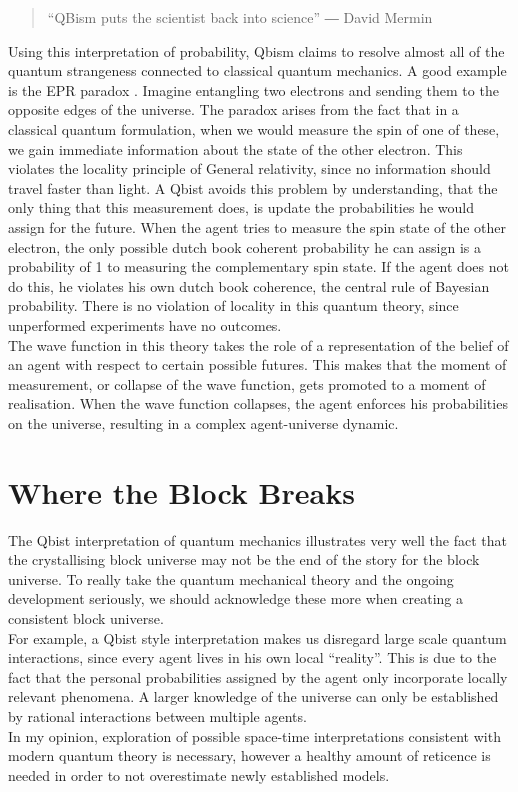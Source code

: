 \documentclass[11pt, a4 paper]{article}
\begin{document}
\begin{multicols}{2}
\begin{quote}
    ``QBism puts the scientist back into science'' \newline― David Mermin \cite{mermin}
\end{quote}
Using this interpretation of probability, Qbism claims to resolve almost all of the quantum strangeness connected to classical quantum mechanics. A good example is the EPR paradox \cite{EPR}. Imagine entangling two electrons and sending them to the opposite edges of the universe. The paradox arises from the fact that in a classical quantum formulation, when we would measure the spin of one of these, we gain immediate information about the state of the other electron. This violates the locality principle of General relativity, since no information should travel faster than light. A Qbist avoids this problem by understanding, that the only thing that this measurement does, is update the probabilities he would assign for the future. When the agent tries to measure the spin state of the other electron, the only possible dutch book coherent probability he can assign is a probability of 1 to measuring the complementary spin state. If the agent does not do this, he violates his own dutch book coherence, the central rule of Bayesian probability. There is no violation of locality in this quantum theory, since unperformed experiments have no outcomes.\\
The wave function in this theory takes the role of a representation of the belief of an agent with respect to certain possible futures. This makes that the moment of measurement, or collapse of the wave function, gets promoted to a moment of realisation. When the wave function collapses, the agent enforces his probabilities on the universe, resulting in a complex agent-universe dynamic.
\end{multicols}

\section{Where the Block Breaks}
The Qbist interpretation of quantum mechanics illustrates very well the fact that the crystallising block universe may not be the end of the story for the block universe. To really take the quantum mechanical theory and the ongoing development seriously, we should acknowledge these more when creating a consistent block universe.\\
For example, a Qbist style interpretation makes us disregard large scale quantum interactions, since every agent lives in his own local ``reality''. This is due to the fact that the personal probabilities assigned by the agent only incorporate locally relevant phenomena. A larger knowledge of the universe can only be established by rational interactions between multiple agents.\\
In my opinion, exploration of possible space-time interpretations consistent with modern quantum theory is necessary, however a healthy amount of reticence is needed in order to not overestimate newly established models.
\begin{multicols}{2}
\end{multicols}
\end{document}
